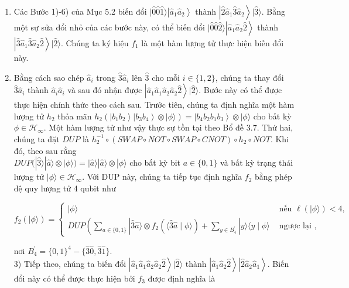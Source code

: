 \documentclass[10pt]{article}
\begin{document}
\begin{enumerate}
  \item Các Bước 1)-6) của Mục 5.2 biến đổi $|\hat{0} \hat{0} \hat{1}\rangle\left|\hat{a}_{1} \hat{a}_{2}\right\rangle$ thành $\left|\hat{2} \hat{a}_{1} \hat{3} \hat{a}_{2}\right\rangle|\hat{3}\rangle$. Bằng một sự sửa đổi nhỏ của các bước này, có thể biến đổi $|\hat{0} \hat{0} \hat{2}\rangle\left|\hat{a}_{1} \hat{a}_{2} \hat{2}\right\rangle$ thành $\left|\hat{3} \hat{a}_{1} \hat{3} \hat{a}_{2} \hat{2}\right\rangle|\hat{2}\rangle$. Chúng ta ký hiệu $f_{1}$ là một hàm lượng tử thực hiện biến đổi này.
  \item Bằng cách sao chép $\hat{a}_{i}$ trong $\hat{3} \hat{a}_{i}$ lên $\hat{3}$ cho mỗi $i \in\{1,2\}$, chúng ta thay đổi $\hat{3} \hat{a}_{i}$ thành $\hat{a}_{i} \hat{a}_{i}$ và sau đó nhận được $\left|\hat{a}_{1} \hat{a}_{1} \hat{a}_{2} \hat{a}_{2} \hat{2}\right\rangle|\hat{2}\rangle$. Bước này có thể được thực hiện chính thức theo cách sau. Trước tiên, chúng ta định nghĩa một hàm lượng tử $h_{2}$ thỏa mãn $h_{2}\left(\left|b_{1} b_{2}\right\rangle\left|b_{3} b_{4}\right\rangle \otimes|\phi\rangle\right)=\left|b_{4} b_{2} b_{1} b_{3}\right\rangle \otimes|\phi\rangle$ cho bất kỳ $\phi \in \mathcal{H}_{\infty}$. Một hàm lượng tử như vậy thực sự tồn tại theo Bổ đề 3.7. Thứ hai, chúng ta đặt $D U P$ là $h_{2}^{-1} \circ(S W A P \circ N O T \circ S W A P \circ C N O T) \circ h_{2} \circ N O T$. Khi đó, theo sau rằng\\
$D U P(|\hat{3}\rangle|\hat{a}\rangle \otimes|\phi\rangle)=|\hat{a}\rangle|\hat{a}\rangle \otimes|\phi\rangle$ cho bất kỳ bit $a \in\{0,1\}$ và bất kỳ trạng thái lượng tử $|\phi\rangle \in \mathcal{H}_{\infty}$. Với DUP này, chúng ta tiếp tục định nghĩa $f_{2}$ bằng phép đệ quy lượng tử 4 qubit như

$$
f_{2}(|\phi\rangle)= \begin{cases}|\phi\rangle & \text { nếu } \ell(|\phi\rangle)<4, \\ D U P\left(\sum_{a \in\{0,1\}}|\hat{3} \hat{a}\rangle \otimes f_{2}(\langle\hat{3} \hat{a} \mid \phi\rangle)+\sum_{y \in B_{4}^{\prime}}|y\rangle\langle y \mid \phi\rangle\right. & \text { ngược lại },\end{cases}
$$

nơi $B_{4}^{\prime}=\{0,1\}^{4}-\{\hat{3} \hat{0}, \hat{3} \hat{1}\}$.\\
3) Tiếp theo, chúng ta biến đổi $\left|\hat{a}_{1} \hat{a}_{1} \hat{a}_{2} \hat{a}_{2} \hat{2}\right\rangle|\hat{2}\rangle$ thành $\left|\hat{a}_{1} \hat{a}_{2} \hat{2}\right\rangle\left|\hat{2} \hat{a}_{2} \hat{a}_{1}\right\rangle$. Biến đổi này có thể được thực hiện bởi $f_{3}$ được định nghĩa là


\end{enumerate}
\end{document}
